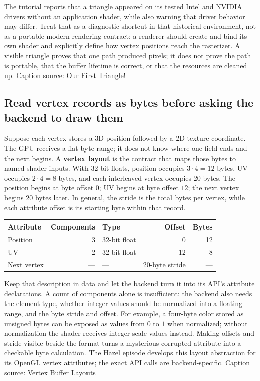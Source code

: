 The tutorial reports that a triangle appeared on its tested Intel and NVIDIA drivers without an application shader, while also warning that driver behavior may differ. Treat that as a diagnostic shortcut in that historical environment, not as a portable modern rendering contract: a renderer should create and bind its own shader and explicitly define how vertex positions reach the rasterizer. A visible triangle proves that one path produced pixels; it does not prove the path is portable, that the buffer lifetime is correct, or that the resources are cleaned up. \href{https://www.youtube.com/watch?v=bwFYXo0VgCc}{Caption source: Our First Triangle!}

\subsection{Read vertex records as bytes before asking the backend to draw them}\label{06-engine-ii-ch025-read-vertex-records-as-bytes-before-asking-the-backend-to-draw-them}

Suppose each vertex stores a 3D position followed by a 2D texture coordinate. The GPU receives a flat byte range; it does not know where one field ends and the next begins. A \textbf{vertex layout} is the contract that maps those bytes to named shader inputs. With 32-bit floats, position occupies \(3\cdot4=12\) bytes, UV occupies \(2\cdot4=8\) bytes, and each interleaved vertex occupies \(20\) bytes. The position begins at byte offset \(0\); UV begins at byte offset \(12\); the next vertex begins \(20\) bytes later. In general, the stride is the total bytes per vertex, while each attribute offset is its starting byte within that record.

{\def\LTcaptype{none} %
\begin{longtable}[]{@{}lrlrr@{}}
\toprule\noalign{}
Attribute & Components & Type & Offset & Bytes \\
\midrule\noalign{}
\endhead
\bottomrule\noalign{}
\endlastfoot
Position & 3 & 32-bit float & 0 & 12 \\
UV & 2 & 32-bit float & 12 & 8 \\
Next vertex & --- & --- & 20-byte stride & --- \\
\end{longtable}
}

Keep that description in data and let the backend turn it into its API's attribute declarations. A count of components alone is insufficient: the backend also needs the element type, whether integer values should be normalized into a floating range, and the byte stride and offset. For example, a four-byte color stored as unsigned bytes can be exposed as values from \(0\) to \(1\) when normalized; without normalization the shader receives integer-scale values instead. Making offsets and stride visible beside the format turns a mysterious corrupted attribute into a checkable byte calculation. The Hazel episode develops this layout abstraction for its OpenGL vertex attributes; the exact API calls are backend-specific. \href{https://www.youtube.com/watch?v=jIJFM_pi6gQ}{Caption source: Vertex Buffer Layouts}

